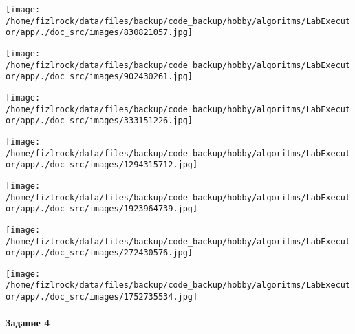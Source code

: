 \documentclass[a4paper, 12pt]{article}
\begin{document}
\texttt{[image: /home/fizlrock/data/files/backup/code\_backup/hobby/algoritms/LabExecutor/app/./doc\_src/images/830821057.jpg]}

\texttt{[image: /home/fizlrock/data/files/backup/code\_backup/hobby/algoritms/LabExecutor/app/./doc\_src/images/902430261.jpg]}

\texttt{[image: /home/fizlrock/data/files/backup/code\_backup/hobby/algoritms/LabExecutor/app/./doc\_src/images/333151226.jpg]}

\texttt{[image: /home/fizlrock/data/files/backup/code\_backup/hobby/algoritms/LabExecutor/app/./doc\_src/images/1294315712.jpg]}

\texttt{[image: /home/fizlrock/data/files/backup/code\_backup/hobby/algoritms/LabExecutor/app/./doc\_src/images/1923964739.jpg]}

\texttt{[image: /home/fizlrock/data/files/backup/code\_backup/hobby/algoritms/LabExecutor/app/./doc\_src/images/272430576.jpg]}

\texttt{[image: /home/fizlrock/data/files/backup/code\_backup/hobby/algoritms/LabExecutor/app/./doc\_src/images/1752735534.jpg]}
\pagebreak
\paragraph{Задание 4}
\end{document}

